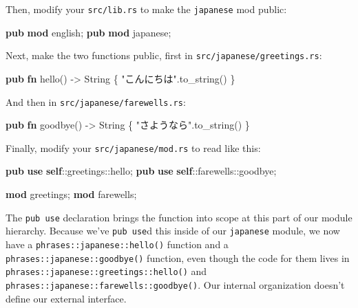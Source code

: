 \documentclass[a4paper,]{book}
\newenvironment{Shaded}{\begin{snugshade}}{\end{snugshade}}
\newcommand{\KeywordTok}[1]{\textcolor[rgb]{0.13,0.29,0.53}{\textbf{{#1}}}}
\newcommand{\StringTok}[1]{\textcolor[rgb]{0.31,0.60,0.02}{{#1}}}
\newcommand{\NormalTok}[1]{{#1}}
\begin{document}
Then, modify your \texttt{src/lib.rs} to make the \texttt{japanese} mod
public:

\begin{Shaded}
\begin{Highlighting}[]
\KeywordTok{pub} \KeywordTok{mod} \NormalTok{english;}
\KeywordTok{pub} \KeywordTok{mod} \NormalTok{japanese;}
\end{Highlighting}
\end{Shaded}

Next, make the two functions public, first in
\texttt{src/japanese/greetings.rs}:

\begin{Shaded}
\begin{Highlighting}[]
\KeywordTok{pub} \KeywordTok{fn} \NormalTok{hello() -> String \{}
    \StringTok{"こんにちは"}\NormalTok{.to_string()}
\NormalTok{\}}
\end{Highlighting}
\end{Shaded}

And then in \texttt{src/japanese/farewells.rs}:

\begin{Shaded}
\begin{Highlighting}[]
\KeywordTok{pub} \KeywordTok{fn} \NormalTok{goodbye() -> String \{}
    \StringTok{"さようなら"}\NormalTok{.to_string()}
\NormalTok{\}}
\end{Highlighting}
\end{Shaded}

Finally, modify your \texttt{src/japanese/mod.rs} to read like this:

\begin{Shaded}
\begin{Highlighting}[]
\KeywordTok{pub} \KeywordTok{use} \KeywordTok{self}\NormalTok{::greetings::hello;}
\KeywordTok{pub} \KeywordTok{use} \KeywordTok{self}\NormalTok{::farewells::goodbye;}

\KeywordTok{mod} \NormalTok{greetings;}
\KeywordTok{mod} \NormalTok{farewells;}
\end{Highlighting}
\end{Shaded}

The \texttt{pub\ use} declaration brings the function into scope at this
part of our module hierarchy. Because we've \texttt{pub\ use}d this
inside of our \texttt{japanese} module, we now have a
\texttt{phrases::japanese::hello()} function and a
\texttt{phrases::japanese::goodbye()} function, even though the code for
them lives in \texttt{phrases::japanese::greetings::hello()} and
\texttt{phrases::japanese::farewells::goodbye()}. Our internal
organization doesn't define our external interface.
\end{document}
